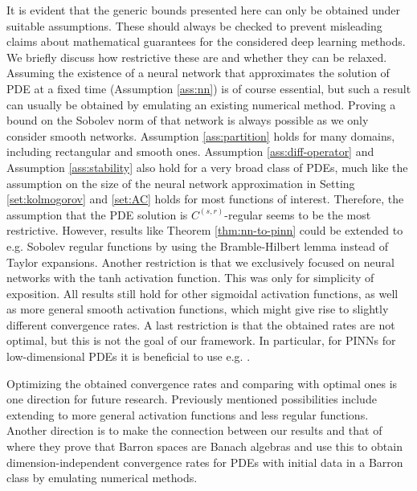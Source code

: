 \documentclass{article}
\numberwithin{equation}{section}
\newcommand{\1}{\mathbbm{1}}
\begin{document}
It is evident that the generic bounds presented here can only be obtained under suitable assumptions. These should always be checked to prevent misleading claims about mathematical guarantees for the considered deep learning methods. We briefly discuss how restrictive these are and whether they can be relaxed. Assuming the existence of a neural network that approximates the solution of PDE at a fixed time (Assumption \ref{ass:nn}) is of course essential, but such a result can usually be obtained by emulating an existing numerical method. Proving a bound on the Sobolev norm of that network is always possible as we only consider smooth networks. Assumption \ref{ass:partition} holds for many domains, including rectangular and smooth ones. Assumption \ref{ass:diff-operator} and Assumption \ref{ass:stability} also hold for a very broad class of PDEs, much like the assumption on the size of the neural network approximation in Setting \ref{set:kolmogorov} and \ref{set:AC} holds for most functions of interest. Therefore, the assumption that the PDE solution is $C^{(s,r)}$-regular seems to be the most restrictive. However, results like Theorem \ref{thm:nn-to-pinn} could be extended to e.g. Sobolev regular functions by using the Bramble-Hilbert lemma instead of Taylor expansions. Another restriction is that we exclusively focused on neural networks with the tanh activation function. This was only for simplicity of exposition. All results still hold for other sigmoidal activation functions, as well as more general smooth activation functions, which might give rise to slightly different convergence rates. A last restriction is that the obtained rates are not optimal, but this is not the goal of our framework. In particular, for PINNs for low-dimensional PDEs it is beneficial to use e.g. \cite{guhring2021approximation,deryck2021approximation}. 

Optimizing the obtained convergence rates and comparing with optimal ones is one direction for future research. Previously mentioned possibilities include extending to more general activation functions and less regular functions. %
Another direction is to make the connection between our results and that of \cite{chen2021representation} where they prove that Barron spaces are Banach algebras and use this to obtain dimension-independent convergence rates for PDEs with initial data in a Barron class by emulating numerical methods. 
\end{document}
